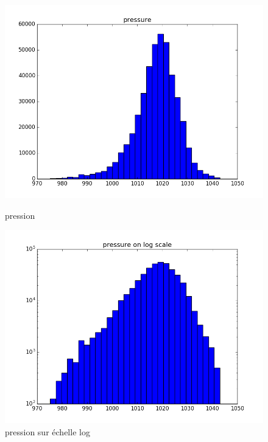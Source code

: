 \begin{figure}[H]
	\captionsetup{labelformat=empty}
	\includegraphics[width=\linewidth]{images/pression.png}
	\caption{pression}
	\endminipage\hfill
	\includegraphics[width=\linewidth]{images/log_pression.png}
	\caption{pression sur échelle log}
	\endminipage\hfill
\end{figure}

